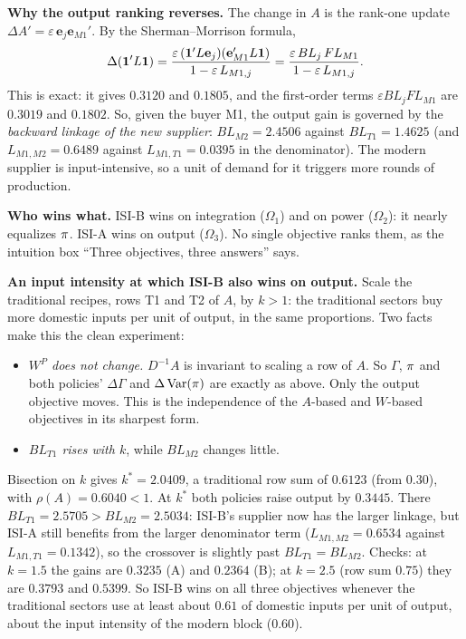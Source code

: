 \documentclass[../solutions_manual.tex]{subfiles}
\begin{document}
\textbf{Why the output ranking reverses.} The change in $A$ is the rank-one update $\Delta A' = \varepsilon\,\mathbf{e}_j\mathbf{e}_{M1}'$. By the Sherman--Morrison formula,
\[
\Delta(\mathbf{1}'L\mathbf{1}) = \frac{\varepsilon\,(\mathbf{1}'L\mathbf{e}_j)(\mathbf{e}_{M1}'L\mathbf{1})}{1 - \varepsilon\,L_{M1,j}} = \frac{\varepsilon\,BL_j\,FL_{M1}}{1 - \varepsilon\,L_{M1,j}}.
\]
This is exact: it gives $0.3120$ and $0.1805$, and the first-order terms $\varepsilon BL_jFL_{M1}$ are $0.3019$ and $0.1802$. So, given the buyer M1, the output gain is governed by the \emph{backward linkage of the new supplier}: $BL_{M2} = 2.4506$ against $BL_{T1} = 1.4625$ (and $L_{M1,M2} = 0.6489$ against $L_{M1,T1} = 0.0395$ in the denominator). The modern supplier is input-intensive, so a unit of demand for it triggers more rounds of production.

\textbf{Who wins what.} ISI-B wins on integration ($\Omega_1$) and on power ($\Omega_2$): it nearly equalizes $\pi$. ISI-A wins on output ($\Omega_3$). No single objective ranks them, as the intuition box ``Three objectives, three answers'' says.

 \textbf{An input intensity at which ISI-B also wins on output.} Scale the traditional recipes, rows T1 and T2 of $A$, by $k > 1$: the traditional sectors buy more domestic inputs per unit of output, in the same proportions. Two facts make this the clean experiment:
\begin{itemize}
\item \emph{$W^P$ does not change.} $D^{-1}A$ is invariant to scaling a row of $A$. So $\Gamma$, $\pi$ and both policies' $\Delta\Gamma$ and $\Delta\operatorname{Var}(\pi)$ are exactly as above. Only the output objective moves. This is the independence of the $A$-based and $W$-based objectives in its sharpest form.
\item \emph{$BL_{T1}$ rises with $k$}, while $BL_{M2}$ changes little.
\end{itemize}
Bisection on $k$ gives $k^* = 2.0409$, a traditional row sum of $0.6123$ (from $0.30$), with $\rho(A) = 0.6040 < 1$. At $k^*$ both policies raise output by $0.3445$. There $BL_{T1} = 2.5705 > BL_{M2} = 2.5034$: ISI-B's supplier now has the larger linkage, but ISI-A still benefits from the larger denominator term ($L_{M1,M2} = 0.6534$ against $L_{M1,T1} = 0.1342$), so the crossover is slightly past $BL_{T1} = BL_{M2}$. Checks: at $k = 1.5$ the gains are $0.3235$ (A) and $0.2364$ (B); at $k = 2.5$ (row sum $0.75$) they are $0.3793$ and $0.5399$. So ISI-B wins on all three objectives whenever the traditional sectors use at least about $0.61$ of domestic inputs per unit of output, about the input intensity of the modern block ($0.60$).
\end{document}

